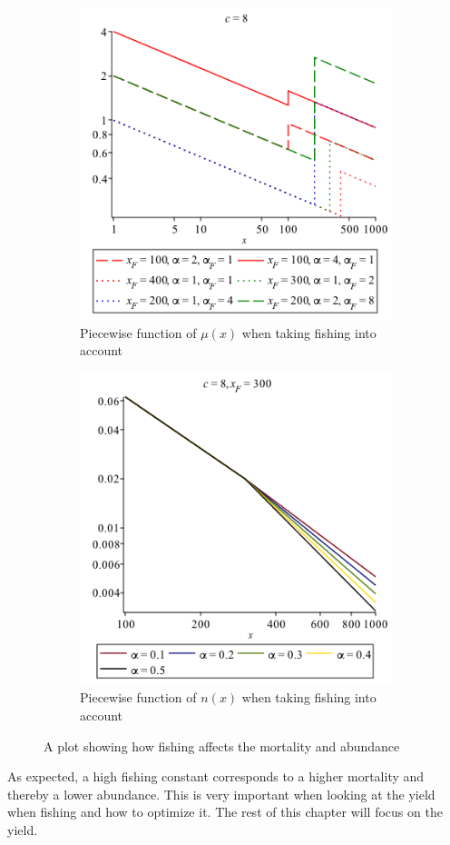 \documentclass{article}
\numberwithin{equation}{section} %
\begin{document}
\begin{figure}[h]
\begin{subfigure}{0.5\textwidth}
\includegraphics[width=0.9\linewidth]{exercises/ex3p1} 
\caption{Piecewise function of $\mu(x)$ when taking fishing into account}

\end{subfigure}
\begin{subfigure}{0.5\textwidth}
\centering
\includegraphics[width=0.9\linewidth]{exercises/ex3p2}
\caption{Piecewise function of $n(x)$ when taking fishing into account}
\end{subfigure}
\caption{A plot showing how fishing affects the mortality and abundance} 
\label{fig:ex3double}
\end{figure}
As expected, a high fishing constant corresponds to a higher mortality and thereby a lower abundance. This is very important when looking at the yield when fishing and how to optimize it. The rest of this chapter will  focus on the yield.
\end{document}
